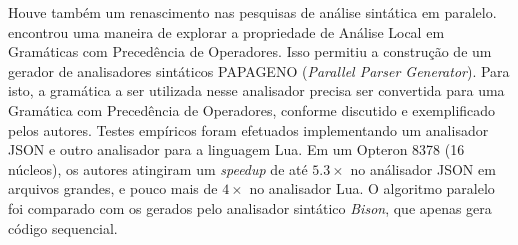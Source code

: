 Houve também um renascimento nas pesquisas de análise sintática em paralelo.
\cite{Barenghi:2015:PPM:2839536.2840146} encontrou uma maneira de explorar
a propriedade de Análise Local em Gramáticas com Precedência de Operadores.
Isso permitiu a construção de um gerador de analisadores sintáticos
PAPAGENO (\textit{Parallel Parser Generator}). Para isto, a gramática a
ser utilizada nesse analisador precisa ser convertida para uma Gramática
com Precedência de Operadores, conforme discutido e exemplificado pelos
autores. Testes empíricos foram efetuados implementando um analisador
JSON e outro analisador para a linguagem Lua. Em um Opteron 8378 (16 núcleos),
os autores atingiram um \textit{speedup} de até $5.3\times$ no análisador JSON
em arquivos grandes, e pouco mais de $4\times$ no analisador Lua. O algoritmo
paralelo foi comparado com os gerados pelo analisador sintático \textit{Bison},
que apenas gera código sequencial.


